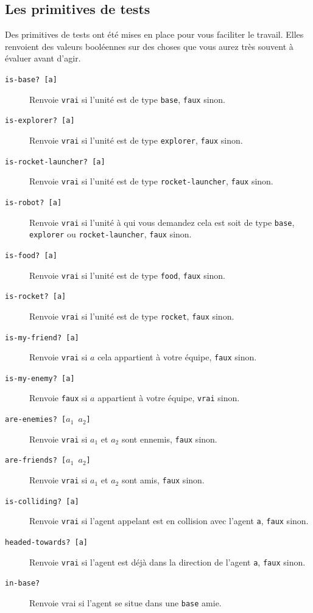 \documentclass[a4paper,11pt]{article}
\begin{document}
\subsection*{Les primitives de tests}

Des primitives de tests ont été mises en place pour vous faciliter le travail. Elles renvoient des
valeurs booléennes sur des choses que vous aurez très souvent à évaluer avant d'agir.

\begin{description}
  \item[\texttt{is-base? [a]}] Renvoie \texttt{vrai} si l'unité est de type \texttt{base}, \texttt{faux} sinon.
  \item[\texttt{is-explorer? [a]}] Renvoie \texttt{vrai} si l'unité est de type \texttt{explorer}, \texttt{faux} sinon.
  \item[\texttt{is-rocket-launcher? [a]}] Renvoie \texttt{vrai} si l'unité est de type \texttt{rocket-launcher}, \texttt{faux} sinon.
  \item[\texttt{is-robot? [a]}] Renvoie \texttt{vrai} si l'unité à qui vous demandez cela est soit de
    type \texttt{base}, \texttt{explorer} ou \texttt{rocket-launcher}, \texttt{faux} sinon.
  \item[\texttt{is-food? [a]}] Renvoie \texttt{vrai} si l'unité est de type \texttt{food}, \texttt{faux} sinon.
  \item[\texttt{is-rocket? [a]}] Renvoie \texttt{vrai} si l'unité est de type \texttt{rocket}, \texttt{faux} sinon.
  \item[\texttt{is-my-friend? [a]}] Renvoie \texttt{vrai} si $a$ cela appartient à
    votre équipe, \texttt{faux} sinon.
  \item[\texttt{is-my-enemy? [a]}] Renvoie \texttt{faux} si $a$ appartient à
    votre équipe, \texttt{vrai} sinon.
 \item[\texttt{are-enemies? [$a_1$ $a_2$]}] Renvoie \texttt{vrai} si $a_1$ et $a_2$ sont ennemis,  \texttt{faux}  sinon.
\item[\texttt{are-friends? [$a_1$ $a_2$]}] Renvoie \texttt{vrai} si $a_1$ et $a_2$ sont amis,  \texttt{faux}  sinon.
  \item[\texttt{is-colliding? [a]}] Renvoie \texttt{vrai} si l'agent appelant est en collision avec l'agent
    \texttt{a}, \texttt{faux} sinon.
  \item[\texttt{headed-towards? [a]}] Renvoie \texttt{vrai} si l'agent est déjà dans la direction de
    l'agent \texttt{a}, \texttt{faux} sinon.
  \item[\texttt{in-base?}] Renvoie vrai si l'agent se situe dans une \texttt{base} amie.

\end{description}
\end{document}
